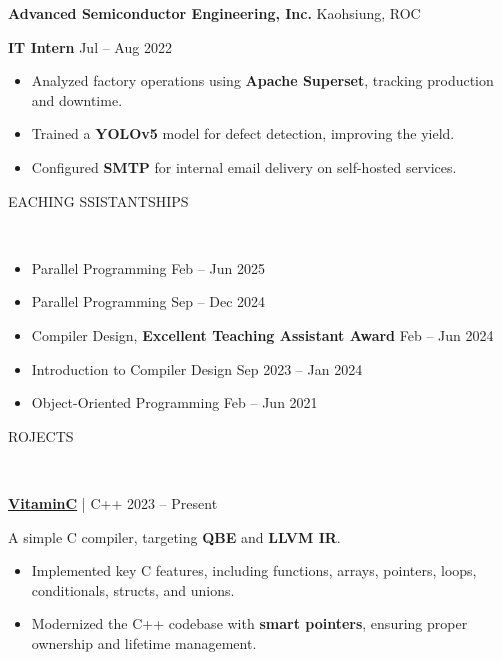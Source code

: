 \documentclass[11pt]{article}
\begin{document}
\textbf{Advanced Semiconductor Engineering, Inc.}   \hfill Kaohsiung, ROC

\textbf{IT Intern} \hfill Jul -- Aug 2022
\begin{itemize}[noitemsep, topsep=0pt, partopsep=0pt, parsep=0pt, leftmargin=*]
    \item Analyzed factory operations using \textbf{Apache Superset}, tracking production and downtime.
    \item Trained a \textbf{YOLOv5} model for defect detection, improving the yield.
    \item Configured \textbf{SMTP} for internal email delivery on self-hosted services.
\end{itemize}

\begin{center}
    \scalebox{1.3}{T}EACHING \scalebox{1.3}{A}SSISTANTSHIPS\raggedright \,\hrulefill
\end{center}

\begin{itemize}[noitemsep, topsep=0pt, partopsep=0pt, parsep=0pt, leftmargin=*]
    \item {}  Parallel Programming \hfill Feb -- Jun 2025
    \item {}  Parallel Programming \hfill Sep -- Dec 2024
    \item {}  Compiler Design, \textbf{Excellent Teaching Assistant Award} \hfill Feb -- Jun 2024
    \item {}  Introduction to Compiler Design \hfill Sep 2023 -- Jan 2024
    \item {}    Object-Oriented Programming \hfill Feb -- Jun 2021
\end{itemize}

\begin{center}
    \scalebox{1.3}{P}ROJECTS\raggedright \,\hrulefill
\end{center}

\textbf{\href{https://github.com/fruits-lab/vitaminc}{VitaminC}} | C++ \hfill 2023 -- Present

A simple C compiler, targeting \textbf{QBE} and \textbf{LLVM IR}.
\begin{itemize}[noitemsep, topsep=0pt, partopsep=0pt, parsep=0pt, leftmargin=*]
    \item Implemented key C features, including functions, arrays, pointers, loops, conditionals, structs, and unions.
    \item Modernized the C++ codebase with \textbf{smart pointers}, ensuring proper ownership and lifetime management.
\end{itemize}
\end{document}
